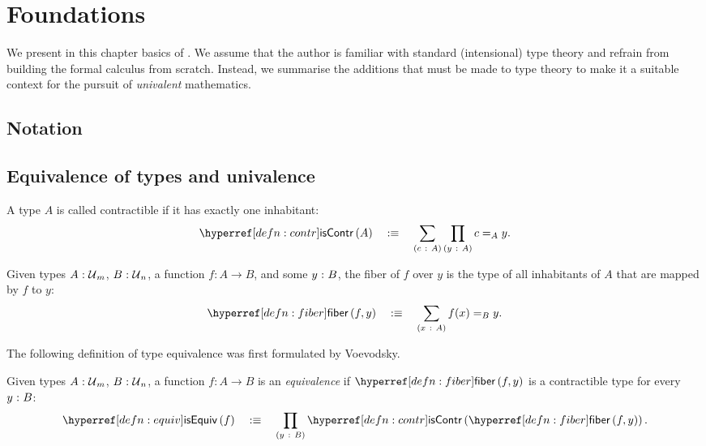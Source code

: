 \chapter{Foundations}\label{chap:foundations}

We present in this chapter basics of \UF{}. We assume that the author is
familiar with standard (intensional) type theory and refrain from building the
formal calculus from scratch. Instead, we summarise the additions that must be
made to type theory to make it a suitable context for the pursuit of
\emph{univalent} mathematics.

\section{Notation}


\section{Equivalence of types and univalence}

\begin{defn}[Contractible]\label{defn:contr}
  A type $A$ is called contractible if it has exactly one inhabitant:
  \begin{equation*}
    \iscontr{A} \quad\is\quad \sigmaty{c}{A}{\pity{y}{A}{c =_A y}}.
  \end{equation*}
\end{defn}

\begin{defn}[Fiber]\label{defn:fiber}
  Given types $A\hspace{0.1mm}:\hspace{0.1mm}\mathcal{U}{}_m$, $B\hspace{0.1mm}:\hspace{0.1mm}\mathcal{U}{}_n$, a function $f : A
  \rightarrow B$, and some $y\hspace{0.1mm}:\hspace{0.1mm}B$, the fiber of $f$ over $y$ is the type of all
  inhabitants of $A$ that are mapped by $f$ to $y$:
  \begin{equation*}
    \fiber{f}{y} \quad\is\quad \sigmaty{x}{A}{f(x) =_B y}.
  \end{equation*}
\end{defn}

The following definition of type equivalence was first formulated by Voevodsky.
\begin{defn}[Equivalence]\label{defn:equiv}
  Given types $A\hspace{0.1mm}:\hspace{0.1mm}\mathcal{U}{}_m$, $B\hspace{0.1mm}:\hspace{0.1mm}\mathcal{U}{}_n$, a function $f : A \rightarrow B$ is an
  \emph{equivalence} if $\fiber{f}{y}$ is a contractible type for every $y\hspace{0.1mm}:\hspace{0.1mm}B$:
  \begin{equation*}
    \isequiv{f} \quad\is\quad \pity{y}{B}{\iscontr{\fiber{f}{y}}}.
  \end{equation*}
\end{defn}

